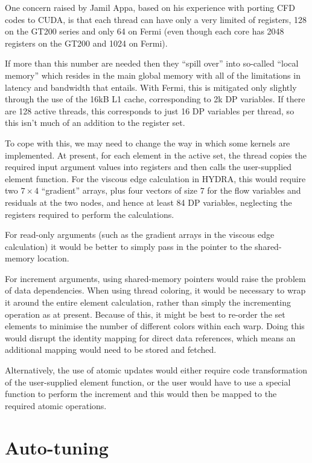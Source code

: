\documentclass[12pt]{article}
\begin{document}
One concern raised by Jamil Appa, based on his experience with 
porting CFD codes to CUDA, is that each thread can have only a very 
limited of registers, 128 on the GT200 series and only 64 on Fermi
(even though each core has 2048 registers on the GT200 and 1024 
on Fermi).

If more than this number are needed then they ``spill over'' into 
so-called ``local memory'' which resides in the main global memory 
with all of the limitations in latency and bandwidth that entails.
With Fermi, this is mitigated only slightly through the use of the 
16kB L1 cache, corresponding to 2k DP variables.  If there are 
128 active threads, this corresponds to just 16 DP variables per
thread, so this isn't much of an addition to the register set.

To cope with this, we may need to change the way in which some kernels 
are implemented.  At present, for each element in the active set, 
the thread copies the required input argument values into registers
and then calls the user-supplied element function.  For the viscous 
edge calculation in HYDRA, this would require two $7\!\times\! 4$
``gradient'' arrays, plus four vectors of size $7$ for the flow 
variables and residuals at the two nodes, and hence at least 84 
DP variables, neglecting the registers required to perform the 
calculations.

For read-only arguments (such as the gradient arrays in the viscous 
edge calculation) it would be better to simply pass in the pointer
to the shared-memory location.

For increment arguments, using shared-memory pointers would raise 
the problem of data dependencies.  When using thread coloring, it 
would be necessary to wrap it around the entire element calculation,
rather than simply the incrementing operation as at present. Because 
of this, it might be best to re-order the set elements to minimise
the number of different colors within each warp.  Doing this would
disrupt the identity mapping for direct data references, which means
an additional mapping would need to be stored and fetched.

Alternatively, the use of atomic updates would either require code 
transformation of the user-supplied element function, or the user 
would have to use a special function to perform the increment and 
this would then be mapped to the required atomic operations.

\newpage

\section{Auto-tuning}
\end{document}
